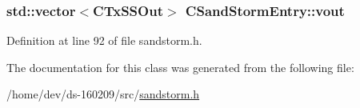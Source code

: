 \subsubsection[{vout}]{\setlength{\rightskip}{0pt plus 5cm}std\+::vector$<${\bf C\+Tx\+S\+S\+Out}$>$ C\+Sand\+Storm\+Entry\+::vout}\label{class_c_sand_storm_entry_a116f3b2ccbbd5958421dfdcce6a4f9c5}


Definition at line 92 of file sandstorm.\+h.



The documentation for this class was generated from the following file\+:\begin{DoxyCompactItemize}
\item 
/home/dev/ds-\/160209/src/\hyperlink{sandstorm_8h}{sandstorm.\+h}\end{DoxyCompactItemize}
